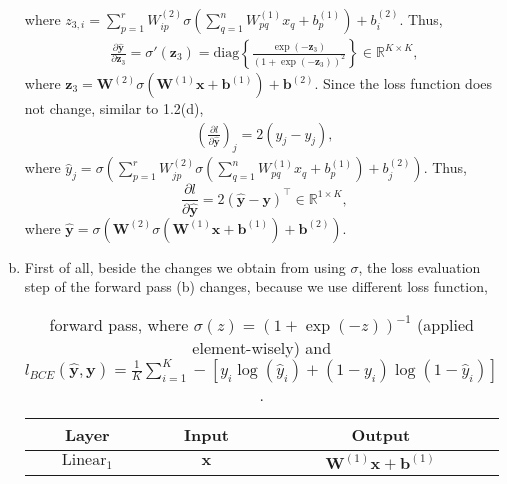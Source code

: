 \documentclass[10pt,a4paper]{article}
\theoremstyle{dotlessP}
\def\RR{\mathbb{R}}
\newcommand{\linear}{\text{Linear}}
\newcommand{\diag}{\text{diag}}
\newcommand{\dldy}{\frac{\partial l}{\partial \bm{\hat{y}}}}
\newcommand{\dydz}{\frac{\partial \bm{\hat{y}}}{\partial \bm z_3}}
\newcommand{\yh}{\bm{\hat{y}}}
\begin{document}
\begin{enumerate}[(a)]
where $z_{3,i}=\sum_{p=1}^{r}W^{(2)}_{ip} \sigma\left( \sum_{q=1}^nW^{(1)}_{pq}x_q+b^{(1)}_p\right)+b^{(2)}_i $.
Thus,
\begin{equation}
\label{eq:dydz2}
\begin{aligned}
\dydz =
\sigma'(\bm z_3) =\diag\left\lbrace \frac{\exp(-\bm z_3) }{( 1+\exp(-\bm z_3) )^2} \right\rbrace 
\in \RR^{K\times K},
\end{aligned}
\end{equation}
where $\bm z_3 = \bm W^{(2)}\sigma\left(\bm W^{(1)} \bm x+\bm b^{(1)}\right) + \bm b^{(2)}$.
Since the loss function does not change, similar to 1.2(d),
\begin{equation}
\begin{aligned}
\left(\dldy\right)_j = 2(\hat{y}_j - y_j),
\end{aligned}
\end{equation}
where $\hat{y}_j = \sigma\left(\sum_{p=1}^{r}W^{(2)}_{jp} \sigma\left( \sum_{q=1}^nW^{(1)}_{pq}x_q+b^{(1)}_p\right)+b^{(2)}_j\right)$.
Thus, 
\begin{equation}
\dldy = 2(\yh -\bm y)^\top 
\in \RR^{1\times K},
\end{equation}
where $\yh = \sigma\left(\bm W^{(2)}\sigma\left(\bm W^{(1)} \bm x+\bm b^{(1)}\right) + \bm b^{(2)}\right)$.
\item First of all, beside the changes we obtain from using $\sigma$,  the loss evaluation step of the forward pass (b) changes, because we use different loss function,
	\begin{table}[tbhp] 
	{\footnotesize
		\caption{ forward pass, where $\sigma(z)=(1+\exp(-z))^{-1}$ (applied element-wisely) and $l_{BCE}(\yh, \bm y)=\frac{1}{K}\sum_{i=1}^{K}-[y_i\log(\hat{y}_i)+(1-y_i)\log(1-\hat{y}_i)]$.
		}\label{tab:fw3}
		\begin{center}
			\renewcommand{\arraystretch}{1.5}
			\begin{tabular}{|c|c|c|}
				\hline 
				Layer & Input  & Output \\ 
				\hline 
				$\linear_1$& $\bm x$ & $\bm W^{(1)} \bm x+\bm b^{(1)}$ \\ 

\end{tabular}
\end{center}}
\end{table}
\end{enumerate}
\end{document}
